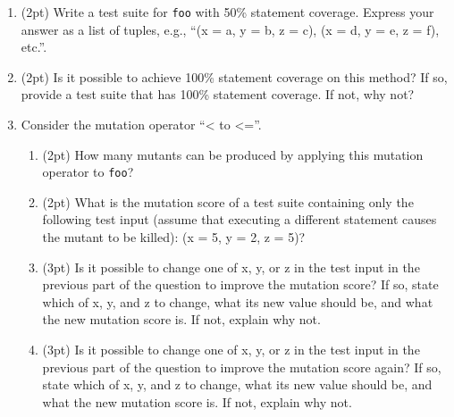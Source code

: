 \documentclass{report}
\newif\ifkey
\newcommand{\answershort}[1]{\ifkey\color{red}\underline{\textbf{#1}}\color{black}\else\underline{\hspace{3in}}\fi\xspace}
\newcommand{\answerlong}[1]{\ifkey\color{red}\textbf{#1}\color{black}\else\vspace{0.5in}\fi\xspace}
\newcommand*{\pts}[1]{\addtocounter{points}{#1}(#1pt)}
\begin{document}
\begin{spacing}{1.4}
\begin{enumerate}[leftmargin=*]
    \newpage

    Questions on this page refer to \textbf{Document C}.
    Assume that the only statements we are interested in are \lstinline{STATEMENT 1} through \lstinline{STATEMENT 4}.

  \item \label{sl1} \pts{2} Write a test suite for \lstinline{foo} with 50\% statement coverage. Express your answer as a list of tuples, e.g., ``(x = a, y = b, z = c), (x = d, y = e, z = f), etc.''. \\
  \answerlong{(x = 6, y = 0, z = 3)}
    
  \item \pts{2} Is it possible to achieve 100\% statement coverage on this method? If so, provide a test suite that has 100\% statement coverage. If not, why not? \\
    \answerlong{It is not possible, because STATEMENT 2 is unreachable.}

  \item \label{el1} Consider the mutation operator ``< to <=''.
    \begin{enumerate}
    \item \pts{2} How many mutants can be produced by applying this mutation operator
    to \lstinline$foo$?\\ \answershort{2}
    \item \pts{2} What is the mutation score of a test suite containing only the following test input (assume that executing a different statement causes the mutant to be killed):
    (x = 5, y = 2, z = 5)?\\ \answershort{0\%}
    \item \pts{3} Is it possible to change one of x, y, or z in the test input in the previous part of the question to improve the mutation score?
    If so, state which of x, y, and z to change, what its new value should be, and what the new mutation score is. If not, explain
    why not. \\
    \answerlong{z = 6 changes the mutation score to 50\%}
    \item \pts{3} Is it possible to change one of x, y, or z in the test input in the previous part of the question to improve the mutation score again?
    If so, state which of x, y, and z to change, what its new value should be, and what the new mutation score is. If not, explain
    why not. \\
    \answerlong{It is not, because the second mutant is an equivalent mutant.}
    \end{enumerate}


\end{enumerate}
\end{spacing}
\end{document}

